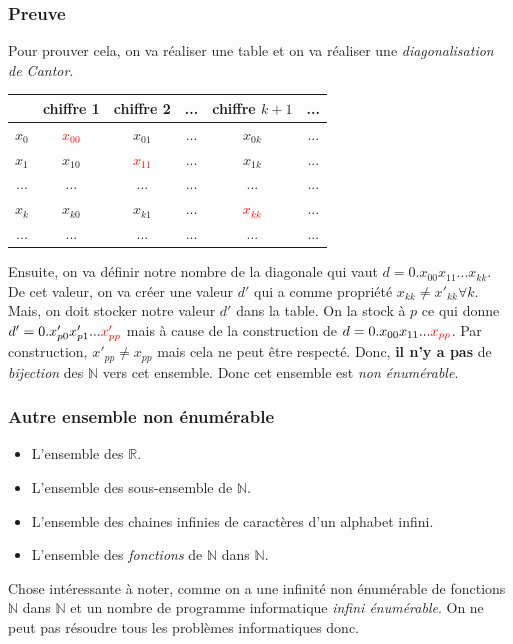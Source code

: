 \documentclass{report}
\begin{document}
\subsubsection{Preuve}
Pour prouver cela, on va réaliser une table et on va réaliser une \textit{diagonalisation de Cantor}.
\begin{center}
\begin{tabular}{|c||c|c|c|c|c|}
	\hline
	 & chiffre 1 & chiffre 2 & ... & chiffre $k+1$ & ...\\
	 \hline
	 $x_0$ & \textcolor{red}{$x_{00}$} & $x_{01}$ & ... & $x_{0k}$ & ...\\
	 \hline
	 $x_1$ & $x_{10}$ & \textcolor{red}{$x_{11}$} & ... & $x_{1k}$ & ...\\
	 \hline
	 ...& ... & ... & ... & ... & ...\\
	 \hline
	 $x_k$ & $x_{k0}$ & $x_{k1}$ & ... & \textcolor{red}{$x_{kk}$} & ...\\
	\hline
	 ...& ... & ... & ... & ... & ...\\
	\hline
\end{tabular}
\end{center}
Ensuite, on va définir notre nombre de la diagonale qui vaut $d = 0.x_{00}x_{11}...x_{kk}$. De cet valeur, on va créer une valeur $d'$ qui a comme propriété $x_{kk} \neq x'_{kk} \forall k$.\\
Mais, on doit stocker notre valeur $d'$ dans la table. On la stock à $p$ ce qui donne $d' = 0.x'_{p0}x'_{p1}... \textcolor{red}{x'_{pp}}$ mais à cause de la construction de $d = 0.x_{00}x_{11}...\textcolor{red}{x_{pp}}$. Par construction, $x'_{pp} \neq x_{pp}$ mais cela ne peut être respecté. Donc, \textbf{il n'y a pas} de \textit{bijection} des $\mathbb{N}$ vers cet ensemble. Donc cet ensemble est \textit{non énumérable}.

\subsubsection{Autre ensemble non énumérable}
\begin{itemize}
\item L'ensemble des $\mathbb{R}$.
\item L'ensemble des sous-ensemble de $\mathbb{N}$.
\item L'ensemble des chaines infinies de caractères d'un alphabet infini.
\item L'ensemble des \textit{fonctions} de $\mathbb{N}$ dans $\mathbb{N}$.
\end{itemize}
Chose intéressante à noter, comme on a une infinité non énumérable de fonctions $\mathbb{N}$ dans $\mathbb{N}$ et un nombre de programme informatique \textit{infini énumérable}. On ne peut pas résoudre tous les problèmes informatiques donc.
\end{document}
